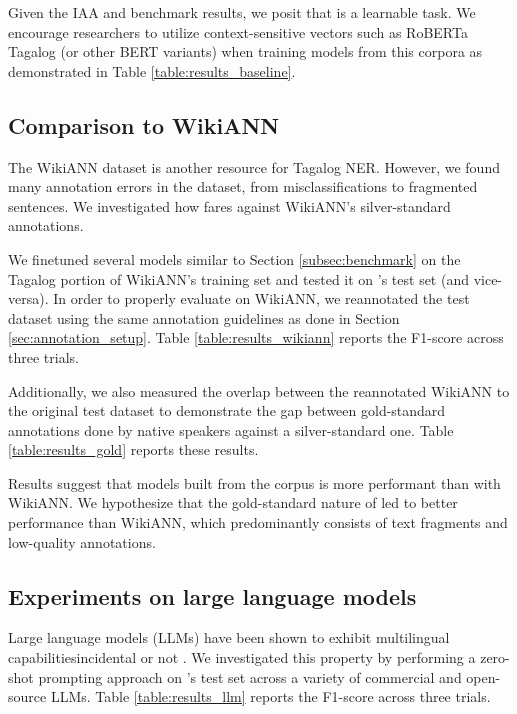\documentclass[11pt]{article}
\begin{document}
Given the IAA and benchmark results, we posit that \tlunified{} is a learnable task.
We encourage researchers to utilize context-sensitive vectors such as RoBERTa Tagalog (or other BERT variants) when training models from this corpora as demonstrated in Table \ref{table:results_baseline}.

\subsection{Comparison to WikiANN}

The WikiANN dataset \citep{Pan2017CrosslingualNT} is another resource for Tagalog NER.
However, we found many annotation errors in the dataset, from misclassifications to fragmented sentences.
We investigated how \tlunified{} fares against WikiANN's silver-standard annotations.



We finetuned several models similar to Section \ref{subsec:benchmark} on the Tagalog portion of WikiANN's training set and tested it on \tlunified{}'s test set (and vice-versa).
In order to properly evaluate on WikiANN, we reannotated the test dataset using the same annotation guidelines as done in Section \ref{sec:annotation_setup}.
Table \ref{table:results_wikiann} reports the F1-score across three trials.

Additionally, we also measured the overlap between the reannotated WikiANN to the original test dataset to demonstrate the gap between gold-standard annotations done by native speakers against a silver-standard one.
Table \ref{table:results_gold} reports these results.



Results suggest that models built from the \tlunified{} corpus is more performant than with WikiANN.
We hypothesize that the gold-standard nature of \tlunified{} led to better performance than WikiANN, which predominantly consists of text fragments and low-quality annotations.

\subsection{Experiments on large language models}

Large language models (LLMs) have been shown to exhibit multilingual capabilities\textemdash incidental or not \citep{Briakou2023SearchingFN}.
We investigated this property by performing a zero-shot prompting approach on \tlunified{}'s test set across a variety of commercial and open-source LLMs.
Table \ref{table:results_llm} reports the F1-score across three trials.
\end{document}
